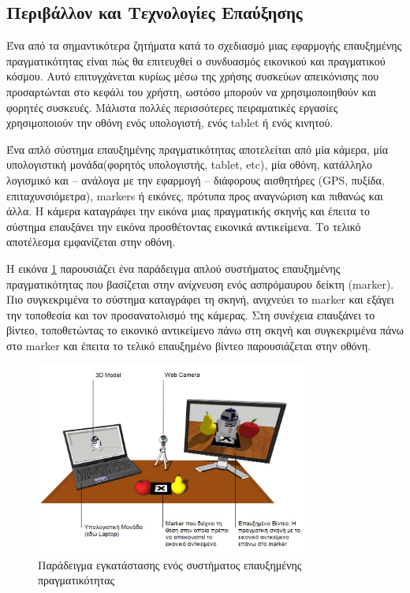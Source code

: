 \subsection{Περιβάλλον και Τεχνολογίες Επαύξησης}

Ένα από τα σημαντικότερα ζητήματα κατά το σχεδιασμό μιας εφαρμογής επαυξημένης πραγματικότητας είναι πώς θα επιτευχθεί ο συνδυασμός εικονικού και πραγματικού κόσμου. Αυτό επιτυγχάνεται κυρίως μέσω της χρήσης συσκεύων απεικόνισης που προσαρτώνται στο κεφάλι του χρήστη, ωστόσο μπορούν να χρησιμοποιηθούν και φορητές συσκευές. Μάλιστα πολλές περισσότερες πειραματικές εργασίες χρησιμοποιούν την οθόνη ενός υπολογιστή, ενός tablet ή ενός κινητού.


Ένα απλό σύστημα επαυξημένης πραγματικότητας αποτελείται από μία κάμερα, μία υπολογιστική μονάδα(φορητός υπολογιστής, tablet, etc), μία οθόνη, κατάλληλο λογισμικό και – ανάλογα με την εφαρμογή – διάφορους αισθητήρες (GPS, πυξίδα, επιταχυνσιόμετρα), markers ή εικόνες, πρότυπα προς αναγνώριση και πιθανώς και άλλα. Η κάμερα καταγράφει την εικόνα μιας πραγματικής σκηνής και έπειτα το σύστημα επαυξάνει την εικόνα προσθέτοντας εικονικά αντικείμενα. Το τελικό αποτέλεσμα εμφανίζεται στην οθόνη. 


Η εικόνα \ref{fig:ar_example} παρουσιάζει ένα παράδειγμα απλού συστήματος επαυξημένης πραγματικότητας που βασίζεται στην ανίχνευση ενός ασπρόμαυρου δείκτη (marker). Πιο συγκεκριμένα το σύστημα καταγράφει τη σκηνή, ανιχνεύει το marker και εξάγει την τοποθεσία και τον προσανατολισμό της κάμερας. Στη συνέχεια επαυξάνει το βίντεο, τοποθετώντας το εικονικό αντικείμενο πάνω στη σκηνή και συγκεκριμένα πάνω στο marker και έπειτα το τελικό επαυξημένο βίντεο παρουσιάζεται στην οθόνη.


\begin{figure}[H]
    \centering
    \includegraphics[width=0.8\textwidth]{Files/Figures/ar_system_example.jpg}
    \caption[Παράδειγμα ενός απλού συστήματος επαυξημένης πραγματικότητας ]{ Παράδειγμα εγκατάστασης ενός συστήματος επαυξημένης πραγματικότητας \cite{ar_example}}
    \label{fig:ar_example}
\end{figure}


